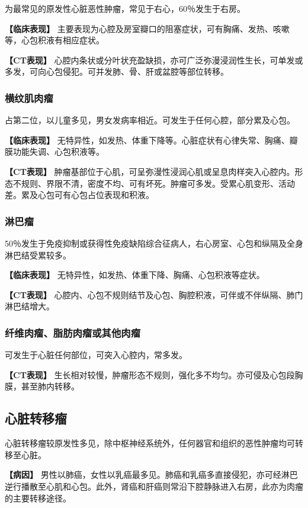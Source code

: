 为最常见的原发性心脏恶性肿瘤，常见于右心，60％发生于右房。

\textbf{【临床表现】}
主要表现为心腔及房室瓣口的阻塞症状，可有胸痛、发热、咳嗽等，心包积液有相应症状。

\textbf{【CT表现】}
心腔内条状或分叶状充盈缺损，亦可广泛弥漫浸润性生长，可单发或多发，可向心包侵犯。可并发肺、骨、肝或盆腔等部位转移。

\subsubsection{横纹肌肉瘤}

占第二位，以儿童多见，男女发病率相近。可发生于任何心腔，部分累及心包。

\textbf{【临床表现】}
无特异性，如发热、体重下降等。心脏症状有心律失常、胸痛、瓣膜功能失调、心包积液等。

\textbf{【CT表现】}
肿瘤基部位于心肌，可呈弥漫性浸润心肌或呈息肉样突入心腔内。形态不规则、界限不清，密度不均、可有坏死。肿瘤可多发。受累心肌变形、活动差。累及心包可有心包占位表现和积液。

\subsubsection{淋巴瘤}

50％发生于免疫抑制或获得性免疫缺陷综合征病人，右心房室、心包和纵隔及全身淋巴结受累较多。

\textbf{【临床表现】} 无特异性，如发热、体重下降、胸痛、心包积液等症状。

\textbf{【CT表现】}
心腔内、心包不规则结节及心包、胸腔积液，可伴或不伴纵隔、肺门淋巴结增大。

\subsubsection{纤维肉瘤、脂肪肉瘤或其他肉瘤}

可发生于心脏任何部位，可突入心腔内，常多发。

\textbf{【CT表现】}
生长相对较慢，肿瘤形态不规则，强化多不均匀。亦可侵及心包段胸膜，甚至肺内转移。

\subsection{心脏转移瘤}

心脏转移瘤较原发性多见，除中枢神经系统外，任何器官和组织的恶性肿瘤均可转移至心脏。

\textbf{【病因】}
男性以肺癌，女性以乳癌最多见。肺癌和乳癌多直接侵犯，亦可经淋巴逆行播散至心肌和心包。此外，肾癌和肝癌则常沿下腔静脉进入右房，此亦为肉瘤的主要转移途径。


